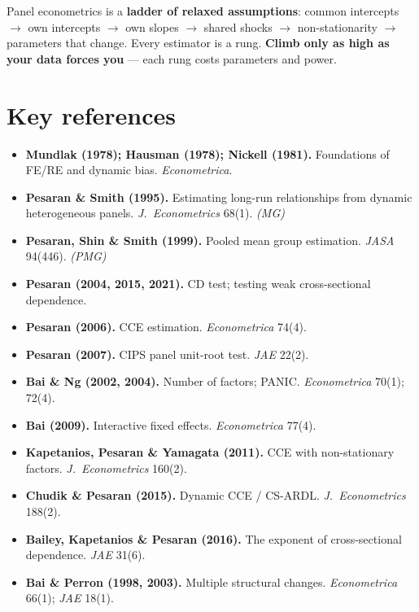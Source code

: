 \documentclass[11pt,a4paper]{article}
\begin{document}
\begin{begbox}
Panel econometrics is a \textbf{ladder of relaxed assumptions}: common intercepts $\to$ own
intercepts $\to$ own slopes $\to$ shared shocks $\to$ non-stationarity $\to$ parameters that change.
Every estimator is a rung. \textbf{Climb only as high as your data forces you} --- each rung costs
parameters and power.
\end{begbox}

\section*{Key references}
\small
\begin{itemize}[leftmargin=1.2em,itemsep=1pt]
 \item \textbf{Mundlak (1978); Hausman (1978); Nickell (1981).} Foundations of FE/RE and dynamic bias. \emph{Econometrica}.
 \item \textbf{Pesaran \& Smith (1995).} Estimating long-run relationships from dynamic heterogeneous panels. \emph{J.\ Econometrics} 68(1). \emph{(MG)}
 \item \textbf{Pesaran, Shin \& Smith (1999).} Pooled mean group estimation. \emph{JASA} 94(446). \emph{(PMG)}
 \item \textbf{Pesaran (2004, 2015, 2021).} CD test; testing weak cross-sectional dependence.
 \item \textbf{Pesaran (2006).} CCE estimation. \emph{Econometrica} 74(4).
 \item \textbf{Pesaran (2007).} CIPS panel unit-root test. \emph{JAE} 22(2).
 \item \textbf{Bai \& Ng (2002, 2004).} Number of factors; PANIC. \emph{Econometrica} 70(1); 72(4).
 \item \textbf{Bai (2009).} Interactive fixed effects. \emph{Econometrica} 77(4).
 \item \textbf{Kapetanios, Pesaran \& Yamagata (2011).} CCE with non-stationary factors. \emph{J.\ Econometrics} 160(2).
 \item \textbf{Chudik \& Pesaran (2015).} Dynamic CCE / CS-ARDL. \emph{J.\ Econometrics} 188(2).
 \item \textbf{Bailey, Kapetanios \& Pesaran (2016).} The exponent of cross-sectional dependence. \emph{JAE} 31(6).
 \item \textbf{Bai \& Perron (1998, 2003).} Multiple structural changes. \emph{Econometrica} 66(1); \emph{JAE} 18(1).

\end{itemize}
\end{document}
